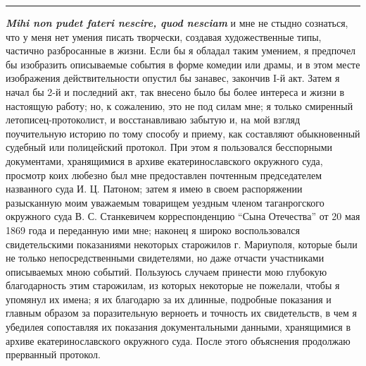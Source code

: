 \documentclass[a4paper,20pt]{article}
\begin{document}
\par\noindent\rule{\textwidth}{0.4pt}

\textbf{\em Mihi non pudet fateri nescire, quod nesciam} и мне не стыдно сознаться, что у
меня нет умения писать творчески, создавая художественные типы, частично
разбросанные в жизни.  Если бы я обладал таким умением, я предпочел бы
изобразить описываемые события в форме комедии или драмы, и в этом месте
изображения действительности опустил бы занавес, закончив I-й акт.
Затем я начал бы 2-й и последний акт, так внесено было бы более интереса и жизни в настоящую работу;
но, к сожалению, это не под силам мне; я только смиренный летописец-протоколист, и восстанавливаю
забытую и, на мой взгляд поучительную историю по тому способу и приему, как составляют обыкновенный судебный или
полицейский протокол. При этом я пользовался бесспорными документами, хранящимися в архиве екатеринославского
окружного суда, просмотр коих любезно был мне предоставлен почтенным председателем
названного суда И. Ц. Патоном; затем я имею в своем распоряжении разысканную моим уважаемым 
товарищем уездным членом таганрогского окружного суда В. С. Станкевичем корреспонденцию 
``Сына Отечества'' от 20 мая 1869 года и переданную ими мне; наконец я широко воспользовался свидетельскими 
показаниями некоторых старожилов г. Мариуполя, которые были не только непосредственными 
свидетелями, но даже отчасти участниками описываемых мною событий.
Пользуюсь случаем принести мою глубокую благодарность этим старожилам, из
которых некоторые не пожелали, чтобы я упомянул их имена; я их благодарю за их
длинные, подробные показания и главным образом за поразительную верноеть и
точность их свидетельств, в чем я убедилея сопоставляя их показания
документальными данными, хранящимися в архиве екатеринославского окружного
суда. После этого объяснения продолжаю прерванный протокол.
\end{document}

